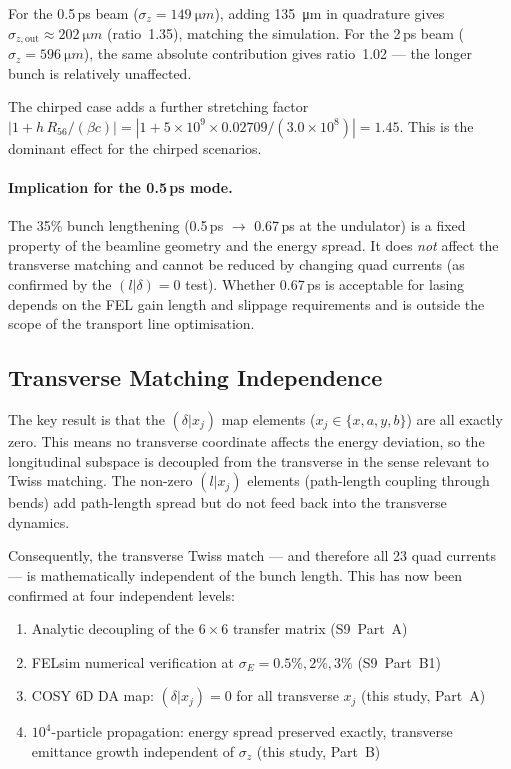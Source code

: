 \documentclass[11pt]{article}
\begin{document}
For the 0.5\,ps beam ($\sigma_z = \SI{149}{\micro m}$), adding
\SI{135}{\micro m} in quadrature gives
$\sigma_{z,\text{out}} \approx \SI{202}{\micro m}$ (ratio~1.35),
matching the simulation.  For the 2\,ps beam
($\sigma_z = \SI{596}{\micro m}$), the same absolute contribution
gives ratio~1.02 --- the longer bunch is relatively unaffected.

The chirped case adds a further stretching factor
$|1 + h\,R_{56}/(\beta c)| = |1 + 5\times10^9 \times 0.02709 / (3.0
\times10^8)| = 1.45$.  This is the dominant effect for the chirped
scenarios.

\paragraph{Implication for the 0.5\,ps mode.}
The 35\% bunch lengthening (0.5\,ps $\to$ 0.67\,ps at the undulator) is a
fixed property of the beamline geometry and the energy spread.  It does
\emph{not} affect the transverse matching and cannot be reduced by changing
quad currents (as confirmed by the $(l|\delta) = 0$ test).  Whether 0.67\,ps
is acceptable for lasing depends on the FEL gain length and slippage
requirements and is outside the scope of the transport line optimisation.

\subsection{Transverse Matching Independence}

The key result is that the $(\delta|x_j)$ map elements
($x_j \in \{x, a, y, b\}$) are all exactly zero.  This means no
transverse coordinate affects the energy deviation, so the longitudinal
subspace is decoupled from the transverse in the sense relevant to Twiss
matching.  The non-zero $(l|x_j)$ elements (path-length coupling through
bends) add path-length spread but do not feed back into the transverse
dynamics.

Consequently, the transverse Twiss match --- and therefore all 23 quad
currents --- is mathematically independent of the bunch length.  This has
now been confirmed at four independent levels:
\begin{enumerate}
  \item Analytic decoupling of the $6\times6$ transfer matrix (S9~Part~A)
  \item FELsim numerical verification at $\sigma_E = 0.5\%, 2\%, 3\%$
    (S9~Part~B1)
  \item COSY 6D DA map: $(\delta|x_j) = 0$ for all transverse $x_j$ (this
    study, Part~A)
  \item $10^4$-particle propagation: energy spread preserved exactly,
    transverse emittance growth independent of $\sigma_z$ (this study,
    Part~B)
\end{enumerate}
\end{document}
